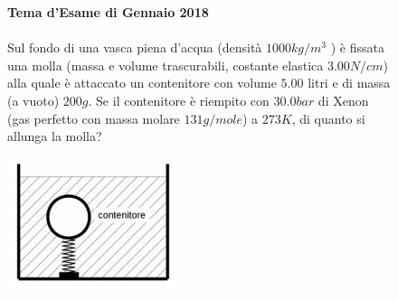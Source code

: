 \begin{figure}[h!]
    \textbf{Tema d'Esame di Gennaio 2018}\\ \\
    Sul fondo di una vasca piena d'acqua (densità $1000 kg/m^3$
    ) è fissata una molla (massa e volume trascurabili, costante elastica $3.00 N/cm$) alla quale è attaccato un contenitore con volume $5.00$ litri e di massa (a vuoto) $200 g$. Se il contenitore è riempito con $30.0 bar$ di Xenon (gas perfetto con massa molare $131 g/mole$) a $273 K$, di quanto si allunga la molla?
    \begin{center}
            \includegraphics[scale=1.1]{ES4/GEN042018.jpg}
    \end{center}
\end{figure}